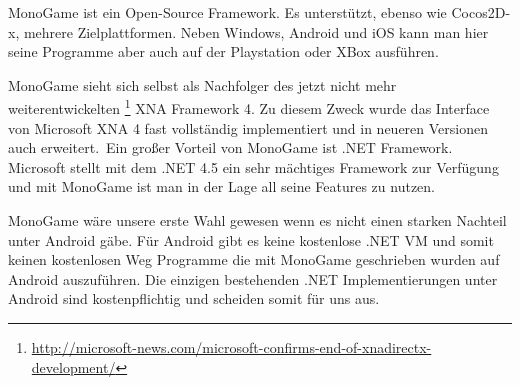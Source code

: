 MonoGame ist ein Open-Source \CS Framework. Es unterstützt, ebenso wie Cocos2D-x, mehrere Zielplattformen. Neben Windows, Android und iOS kann man hier seine Programme aber auch auf der Playstation oder XBox ausführen.

MonoGame sieht sich selbst als Nachfolger des jetzt nicht mehr weiterentwickelten \footnote{\url{http://microsoft-news.com/microsoft-confirms-end-of-xnadirectx-development/}} XNA Framework 4. Zu diesem Zweck wurde das Interface von Microsoft XNA 4 fast vollständig implementiert und in neueren Versionen auch erweitert.\
Ein großer Vorteil von MonoGame ist .NET Framework. Microsoft stellt mit dem .NET 4.5 ein sehr mächtiges Framework zur Verfügung und mit MonoGame ist man in der Lage all seine Features zu nutzen.

MonoGame wäre unsere erste Wahl gewesen wenn es nicht einen starken Nachteil unter Android gäbe. Für Android gibt es keine kostenlose .NET VM und somit keinen kostenlosen Weg Programme die mit MonoGame geschrieben wurden auf Android auszuführen. Die einzigen bestehenden .NET Implementierungen unter Android sind kostenpflichtig und scheiden somit für uns aus.